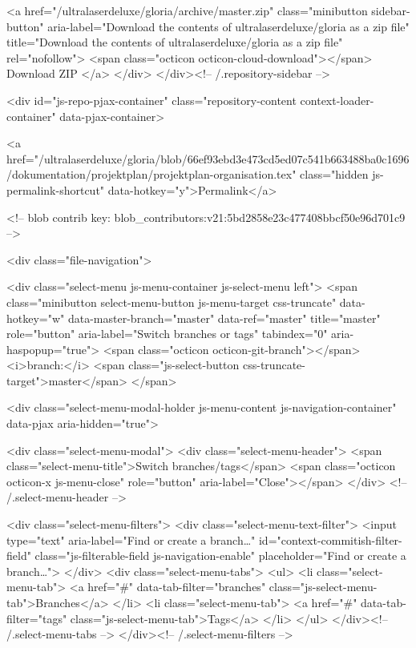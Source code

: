                 <a href="/ultralaserdeluxe/gloria/archive/master.zip"
                   class="minibutton sidebar-button"
                   aria-label="Download the contents of ultralaserdeluxe/gloria as a zip file"
                   title="Download the contents of ultralaserdeluxe/gloria as a zip file"
                   rel="nofollow">
                  <span class="octicon octicon-cloud-download"></span>
                  Download ZIP
                </a>
              </div>
        </div><!-- /.repository-sidebar -->

        <div id="js-repo-pjax-container" class="repository-content context-loader-container" data-pjax-container>
          

<a href="/ultralaserdeluxe/gloria/blob/66ef93ebd3e473cd5ed07c541b663488ba0c1696/dokumentation/projektplan/projektplan-organisation.tex" class="hidden js-permalink-shortcut" data-hotkey="y">Permalink</a>

<!-- blob contrib key: blob_contributors:v21:5bd2858e23c477408bbcf50e96d701c9 -->

<div class="file-navigation">
  
<div class="select-menu js-menu-container js-select-menu left">
  <span class="minibutton select-menu-button js-menu-target css-truncate" data-hotkey="w"
    data-master-branch="master"
    data-ref="master"
    title="master"
    role="button" aria-label="Switch branches or tags" tabindex="0" aria-haspopup="true">
    <span class="octicon octicon-git-branch"></span>
    <i>branch:</i>
    <span class="js-select-button css-truncate-target">master</span>
  </span>

  <div class="select-menu-modal-holder js-menu-content js-navigation-container" data-pjax aria-hidden="true">

    <div class="select-menu-modal">
      <div class="select-menu-header">
        <span class="select-menu-title">Switch branches/tags</span>
        <span class="octicon octicon-x js-menu-close" role="button" aria-label="Close"></span>
      </div> <!-- /.select-menu-header -->

      <div class="select-menu-filters">
        <div class="select-menu-text-filter">
          <input type="text" aria-label="Find or create a branch…" id="context-commitish-filter-field" class="js-filterable-field js-navigation-enable" placeholder="Find or create a branch…">
        </div>
        <div class="select-menu-tabs">
          <ul>
            <li class="select-menu-tab">
              <a href="#" data-tab-filter="branches" class="js-select-menu-tab">Branches</a>
            </li>
            <li class="select-menu-tab">
              <a href="#" data-tab-filter="tags" class="js-select-menu-tab">Tags</a>
            </li>
          </ul>
        </div><!-- /.select-menu-tabs -->
      </div><!-- /.select-menu-filters -->


